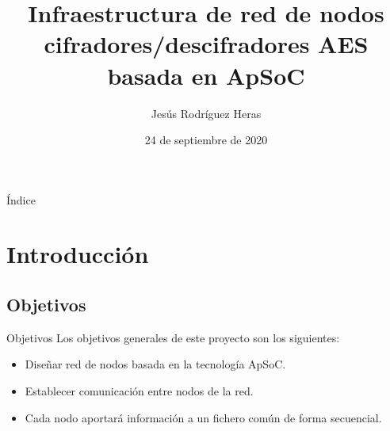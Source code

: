 \documentclass[aspectratio=169]{beamer}
\title{Infraestructura de red de nodos cifradores/descifradores AES basada en ApSoC}
\author{Jesús Rodríguez Heras}
\date{24 de septiembre de 2020}
\begin{document}
\begin{frame}
  \titlepage
  
\end{frame}

\begin{frame}{Índice}
\tableofcontents
\end{frame}

\section{Introducción}
\subsection{Objetivos}
\begin{frame}{Objetivos}
Los objetivos generales de este proyecto son los siguientes:
\begin{itemize}
	\item Diseñar red de nodos basada en la tecnología ApSoC.
	\item Establecer comunicación entre nodos de la red.
	\item Cada nodo aportará información a un fichero común de forma secuencial.
\end{itemize}
\end{frame}
\end{document}
